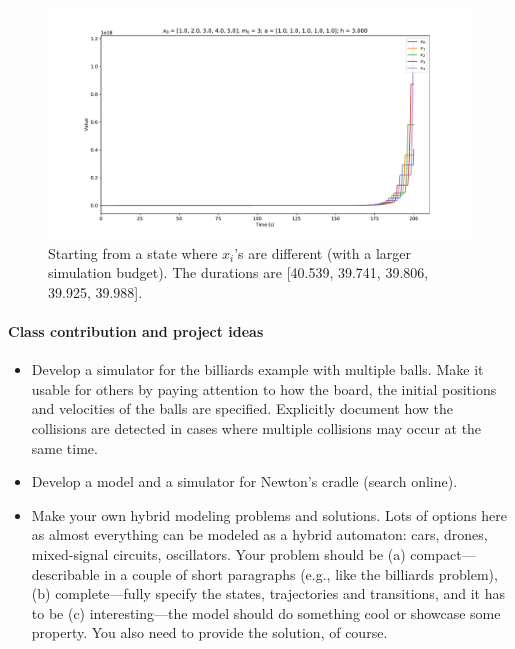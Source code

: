 \documentclass[11pt]{article}
\begin{document}
\begin{figure}[h]
\centering
\includegraphics[width=12cm]{different_initial_longer}
\caption{Starting from a state where $x_i$'s are different (with a larger simulation budget). The durations are [40.539, 39.741, 39.806, 39.925, 39.988].}
\label{fig:different_longer}
\end{figure}

\paragraph{Class contribution and project ideas}
\begin{itemize}
\item Develop a simulator for the billiards example with multiple balls. Make it usable for others by paying attention to how the board, the initial positions and velocities of the balls are specified. Explicitly document how the collisions are detected in cases where multiple collisions may occur at the same time.
\item Develop a model and a simulator for Newton's cradle (search online).
\item Make your own  hybrid modeling problems and solutions. Lots of options here as almost everything can be modeled as a hybrid automaton: cars, drones, mixed-signal circuits, oscillators. Your problem should be (a) compact---describable in a couple of short paragraphs (e.g., like the billiards problem), (b) complete---fully specify the states, trajectories and transitions, and it has to be (c) interesting---the model should do something cool or showcase some property. You also need to provide the solution, of course.
\end{itemize}

%
%	
\end{document}
